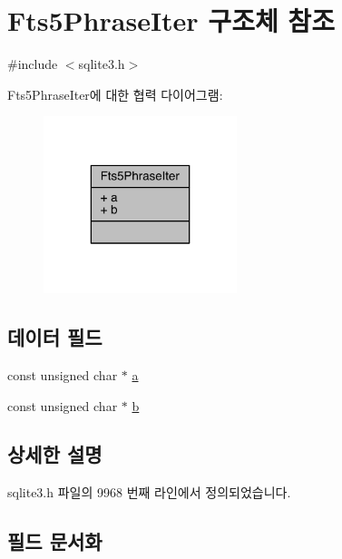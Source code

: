 \hypertarget{struct_fts5_phrase_iter}{}\section{Fts5\+Phrase\+Iter 구조체 참조}
\label{struct_fts5_phrase_iter}


{\ttfamily \#include $<$sqlite3.\+h$>$}



Fts5\+Phrase\+Iter에 대한 협력 다이어그램\+:
\nopagebreak
\begin{figure}[H]
\begin{center}
\leavevmode
\includegraphics[width=160pt]{d5/dde/struct_fts5_phrase_iter__coll__graph}
\end{center}
\end{figure}
\subsection*{데이터 필드}
\begin{DoxyCompactItemize}
\item 
const unsigned char $\ast$ \hyperlink{struct_fts5_phrase_iter_a335969d1ac0fcbb94173c472a3f179ae}{a}
\item 
const unsigned char $\ast$ \hyperlink{struct_fts5_phrase_iter_a459180b0d670604aa38b3ac94be6adda}{b}
\end{DoxyCompactItemize}


\subsection{상세한 설명}


sqlite3.\+h 파일의 9968 번째 라인에서 정의되었습니다.



\subsection{필드 문서화}
\mbox{\label{struct_fts5_phrase_iter_a335969d1ac0fcbb94173c472a3f179ae}} 
